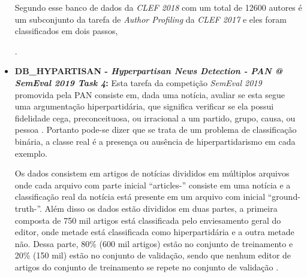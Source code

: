 \begin{itemize}
        Segundo  esse banco de dados da \textit{CLEF 2018} com um total de 12600 autores é um subconjunto da tarefa de \textit{Author Profiling} da \textit{CLEF 2017} e eles foram classificados em dois passos,
        \cite{rangel2017overview}.
        
        
        \item \textbf{DB\_HYPARTISAN - \textit{Hyperpartisan News Detection - PAN @ SemEval 2019 Task 4}:} Esta tarefa da competição \textit{SemEval 2019} promovida pela PAN consiste em, dada uma notícia, avaliar se esta segue uma argumentação hiperpartidária, que significa verificar se ela possui fidelidade cega, preconceituosa, ou irracional a um partido, grupo, causa, ou pessoa \cite{PAN_HND_2019}.
        Portanto pode-se dizer que se trata de um problema de classificação binária, a classe real é a presença ou ausência de hiperpartidarismo em cada exemplo.
        
        Os dados consistem em artigos de notícias divididos em múltiplos arquivos onde cada arquivo com parte inicial ``articles-'' consiste em uma notícia e a classificação real da notícia está presente em um arquivo com inicial ``ground-truth-''. 
        Além disso os dados estão divididos em duas partes, a primeira composta de 750 mil artigos está classificada pelo enviesamento geral do editor, onde metade está classificada como hiperpartidária e a outra metade não. 
        Dessa parte, 80\% (600 mil artigos) estão no conjunto de treinamento e 20\% (150 mil) estão no conjunto de validação, sendo que nenhum editor de artigos do conjunto de treinamento se repete no conjunto de validação \cite{johannes_kiesel_2018_1489920}.
        

\end{itemize}
